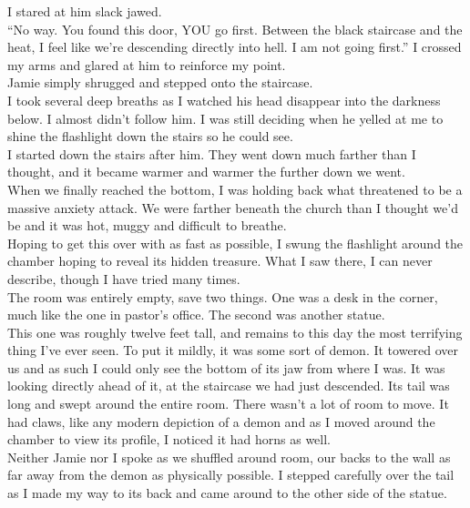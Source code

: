 \documentclass[a5paper]{scrartcl}
\begin{document}
I stared at him slack jawed. \\


\enquote{No way. You found this door, YOU go first. Between the black staircase and the heat, I feel like we're descending directly into hell. I am not going first.} I crossed my arms and glared at him to reinforce my point. \\


Jamie simply shrugged and stepped onto the staircase. \\


I took several deep breaths as I watched his head disappear into the darkness below. I almost didn't follow him. I was still deciding when he yelled at me to shine the flashlight down the stairs so he could see. \\


I started down the stairs after him. They went down much farther than I thought, and it became warmer and warmer the further down we went. \\


When we finally reached the bottom, I was holding back what threatened to be a massive anxiety attack. We were farther beneath the church than I thought we'd be and it was hot, muggy and difficult to breathe. \\


Hoping to get this over with as fast as possible, I swung the flashlight around the chamber hoping to reveal its hidden treasure. What I saw there, I can never describe, though I have tried many times. \\


The room was entirely empty, save two things. One was a desk in the corner, much like the one in pastor's office. The second was another statue. \\


This one was roughly twelve feet tall, and remains to this day the most terrifying thing I've ever seen. To put it mildly, it was some sort of demon. It towered over us and as such I could only see the bottom of its jaw from where I was. It was looking directly ahead of it, at the staircase we had just descended. Its tail was long and swept around the entire room. There wasn't a lot of room to move. It had claws, like any modern depiction of a demon and as I moved around the chamber to view its profile, I noticed it had horns as well. \\


Neither Jamie nor I spoke as we shuffled around room, our backs to the wall as far away from the demon as physically possible. I stepped carefully over the tail as I made my way to its back and came around to the other side of the statue. \\
\end{document}
